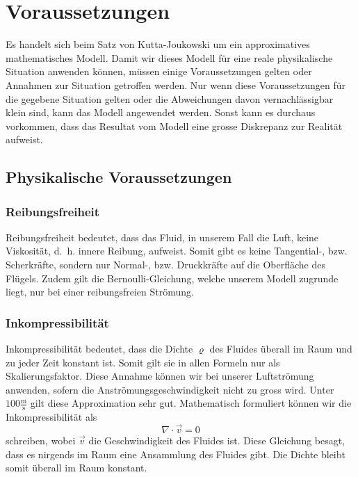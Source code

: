 \section{Voraussetzungen}
\label{joukowski:sec:voraussetzungen}

Es handelt sich beim Satz von Kutta-Joukowski um ein approximatives mathematisches Modell. 
Damit wir dieses Modell für eine reale physikalische Situation anwenden können,
müssen einige Voraussetzungen gelten oder Annahmen zur Situation getroffen werden.
Nur wenn diese Voraussetzungen für die gegebene Situation gelten oder die Abweichungen davon vernachlässigbar klein sind,
kann das Modell angewendet werden.
Sonst kann es durchaus vorkommen,
dass das Resultat vom Modell eine grosse Diskrepanz zur Realität aufweist.

\subsection{Physikalische Voraussetzungen}

\subsubsection{Reibungsfreiheit}
%
	Reibungsfreiheit bedeutet,
	dass das Fluid,
	in unserem Fall die Luft, 
	keine Viskosität,
	d.~h. innere Reibung,
	aufweist.
	Somit gibt es keine Tangential-, bzw. Scherkräfte,
	sondern nur Normal-, bzw. Druckkräfte auf die Oberfläche des Flügels.
	Zudem gilt die Bernoulli-Gleichung,
	welche unserem Modell zugrunde liegt,
	nur bei einer reibungsfreien Strömung.

\subsubsection{Inkompressibilität}
%
	Inkompressibilität bedeutet, dass die Dichte $\varrho$ des Fluides überall im Raum und zu jeder Zeit konstant ist.
%
%
	Somit gilt sie in allen Formeln nur als Skalierungsfaktor.
	Diese Annahme können wir bei unserer Luftströmung anwenden,
	sofern die Anströmungsgeschwindigkeit nicht zu gross wird.
	Unter $100\frac{\text{m}}{\text{s}}$ gilt diese Approximation sehr gut.
	Mathematisch formuliert können wir die Inkompressibilität als
	\begin{equation}
		\label{joukowski:voraussetzungen:inkompressibel}
		\nabla \cdot \vec{v}
		=
		0
	\end{equation}
	schreiben, wobei $\vec{v}$ die Geschwindigkeit des Fluides ist. 
	Diese Gleichung besagt, dass es nirgends im Raum eine Ansammlung des Fluides gibt. Die Dichte  bleibt somit überall im Raum konstant.

